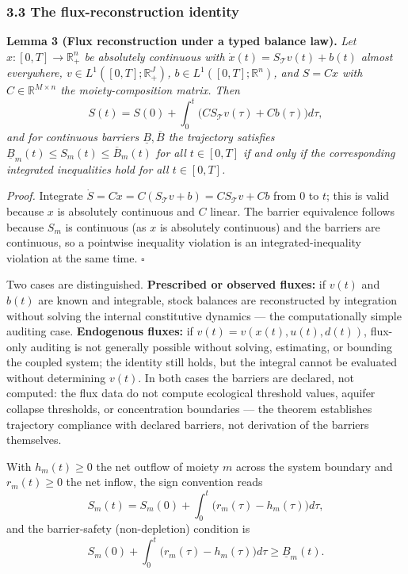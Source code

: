 \documentclass[11pt]{article}
\begin{document}
\subsubsection{3.3 The flux-reconstruction
identity}\label{the-flux-reconstruction-identity}

\textbf{Lemma 3 (Flux reconstruction under a typed balance law).}
\emph{Let \(x : [0,T] \to \mathbb{R}_+^n\) be absolutely continuous with
\(\dot x(t) = S_{\mathcal{T}} v(t) + b(t)\) almost everywhere,
\(v \in L^1([0,T]; \mathbb{R}_+^J)\),
\(b \in L^1([0,T]; \mathbb{R}^n)\), and \(S = Cx\) with
\(C \in \mathbb{R}^{M \times n}\) the moiety-composition matrix. Then}
\[S(t) = S(0) + \int_0^t \bigl( C S_{\mathcal{T}} v(\tau) + Cb(\tau) \bigr) d\tau,\]
\emph{and for continuous barriers \(\underline{B}, \overline{B}\) the
trajectory satisfies
\(\underline{B}_m(t) \le S_m(t) \le \overline{B}_m(t)\) for all
\(t \in [0,T]\) if and only if the corresponding integrated inequalities
hold for all \(t \in [0,T]\).}

\emph{Proof.} Integrate
\(\dot S = C\dot x = C(S_{\mathcal{T}} v + b) = C S_{\mathcal{T}} v + Cb\)
from \(0\) to \(t\); this is valid because \(x\) is absolutely
continuous and \(C\) linear. The barrier equivalence follows because
\(S_m\) is continuous (as \(x\) is absolutely continuous) and the
barriers are continuous, so a pointwise inequality violation is an
integrated-inequality violation at the same time. \ensuremath{\square}

Two cases are distinguished. \textbf{Prescribed or observed fluxes:} if
\(v(t)\) and \(b(t)\) are known and integrable, stock balances are
reconstructed by integration without solving the internal constitutive
dynamics --- the computationally simple auditing case.
\textbf{Endogenous fluxes:} if \(v(t) = v(x(t), u(t), d(t))\), flux-only
auditing is not generally possible without solving, estimating, or
bounding the coupled system; the identity still holds, but the integral
cannot be evaluated without determining \(v(t)\). In both cases the
barriers are declared, not computed: the flux data do not compute
ecological threshold values, aquifer collapse thresholds, or
concentration boundaries --- the theorem establishes trajectory
compliance with declared barriers, not derivation of the barriers
themselves.

With \(h_m(t) \ge 0\) the net outflow of moiety \(m\) across the system
boundary and \(r_m(t) \ge 0\) the net inflow, the sign convention reads
\[S_m(t) = S_m(0) + \int_0^t \bigl( r_m(\tau) - h_m(\tau) \bigr) d\tau,\]
and the barrier-safety (non-depletion) condition is
\[S_m(0) + \int_0^t \bigl( r_m(\tau) - h_m(\tau) \bigr) d\tau \ge \underline{B}_m(t).\]
\end{document}
